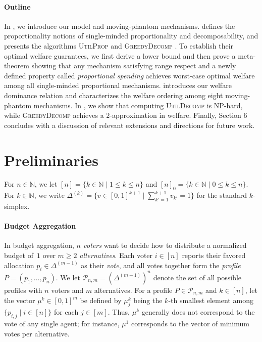 \documentclass[11pt]{article}
\newcommand{\N}{\mathbb{N}}
\newcommand{\p}{p}   %
\newcommand{\UtP}{\textsc{UtilProp} }
\newcommand{\GrdDec}{\textsc{GreedyDecomp} }
\newcommand{\UtDec}{\textsc{UtilDecomp} }
\begin{document}
\paragraph{Outline} In , we introduce our model and moving-phantom mechanisms.  defines the proportionality notions of single-minded proportionality and decomposability, and presents the algorithms \UtP and \GrdDec. To establish their optimal welfare guarantees, we first derive a lower bound and then prove a meta-theorem showing that any mechanism satisfying range respect 
\cite{elkind2026settling} and a newly defined property called \emph{proportional spending} achieves worst-case optimal welfare among all single-minded proportional mechanisms.  introduces our welfare dominance relation and characterizes the welfare ordering among eight moving-phantom mechanisms. In , we show that computing \UtDec is NP-hard, while \GrdDec achieves a $2$-approximation in welfare. 
Finally, Section 6 concludes with a discussion of relevant extensions and directions for future work.





\section{Preliminaries}\label{sec:prelim}



For $n \in \N$, we let $[n] = \{k \in \N \mid 1 \le k \le n\}$ and $[n]_0 = \{k \in \N \mid 0 \le k \le n\}$. For $k \in \N$, we write $\Delta^{(k)} = \{ v \in [0,1]^{k+1} \mid \sum_{k' = 1}^{k+1} v_{k'} = 1 \}$ for the standard $k$-simplex. 

\paragraph{Budget Aggregation} In budget aggregation, $n$ \textit{voters} want to decide how to distribute a normalized budget of~$1$ over $m \ge 2$ \textit{alternatives}. Each voter $i \in [n]$ reports their favored allocation $\p_i \in \Delta^{(m-1)}$ as their \textit{vote}, and all votes together form the \textit{profile} $P = (\p_1, \dots, \p_n)$. We let $\mathcal{P}_{n,m} = (\Delta^{(m-1)})^n$ denote the set of all possible profiles with $n$ voters and $m$ alternatives. 
For a profile $P \in \mathcal{P}_{n,m}$ and $k \in [n]$, let the vector $\mu^k \in [0,1]^m$ be defined by $\mu^k_j$ being the $k$-th smallest element among $\{p_{i,j} \mid i \in [n]\}$ for each $j \in [m]$. Thus, $\mu^k$ generally does not correspond to the vote of any single agent; for instance, $\mu^1$ corresponds to the vector of minimum votes per alternative. 
\end{document}
